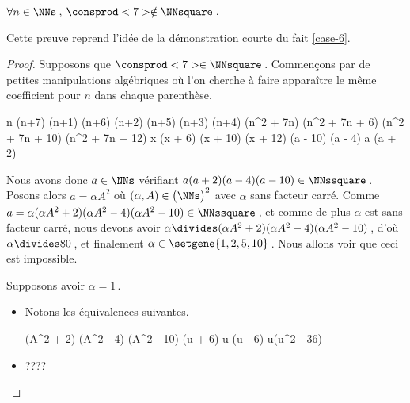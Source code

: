 \begin{fact} \label{case-8}
	 $\forall n \in \NNs$\,, $\consprod<7> \notin \NNsquare$\,.
\end{fact}




Cette preuve reprend l'idée de la démonstration courte du fait \ref{case-6}.

\begin{proof}
    Supposons que $\consprod<7> \in \NNsquare$\,.
    Commençons par de petites manipulations algébriques où l'on cherche à faire apparaître le même coefficient pour $n$ dans chaque parenthèse.
    
    \medskip
    \begin{stepcalc}[style = sar]
	\explnext{}
		n (n+7) \cdot (n+1) (n+6) \cdot (n+2) (n+5) \cdot (n+3) (n+4)
	\explnext{}
		(n^2 + 7n) (n^2 + 7n + 6) (n^2 + 7n + 10) (n^2 + 7n + 12)
		x (x + 6) (x + 10) (x + 12)
		(a - 10) (a - 4) a (a + 2)
    \end{stepcalc}
  
    \medskip
    Nous avons donc $a \in \NNs$ vérifiant $a (a + 2) (a - 4) (a - 10) \in \NNssquare$\,. 
    Posons alors $a = \alpha A^2$ où $(\alpha, A) \in \big( \NNs \big)^2$ avec $\alpha$ sans facteur carré.
    Comme $a = \alpha (\alpha A^2 + 2) (\alpha A^2 - 4) (\alpha A^2 - 10) \in \NNssquare$\,,
    et comme de plus $\alpha$ est sans facteur carré, nous devons avoir $\alpha \divides (\alpha A^2 + 2) (\alpha A^2 - 4) (\alpha A^2 - 10)$\,, d'où $\alpha \divides 80$\,, et finalement $\alpha \in \setgene{1, 2, 5, 10}$\,.
    Nous allons voir que ceci est impossible.


    Supposons avoir $\alpha = 1$\,.
    
    \begin{itemize}
    	\item Notons les équivalences suivantes.
        
        \medskip
        \noindent\kern-6pt%
        \begin{stepcalc}[style=ar*, ope=\iff]
        	(A^2 + 2) (A^2 - 4) (A^2 - 10)\in \NNssquare
        	(u + 6) u (u - 6) \in \NNssquare
    	\explnext{}
        	u(u^2 - 36) \in \NNssquare
        \end{stepcalc}

		\item ????
    \end{itemize}
\end{proof}

